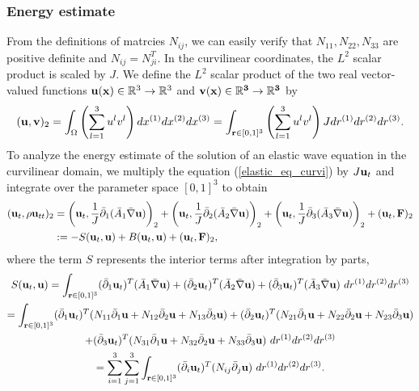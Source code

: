 \subsubsection{Energy estimate}
From the definitions of matrcies $N_{ij}$, we can easily verify that $N_{11}, N_{22}, N_{33}$ are positive definite and $N_{ij} = N_{ji}^T$. In the curvilinear coordinates, the $L^2$ scalar product is scaled by $J$. We define the $L^2$ scalar product of the two real vector-valued functions ${\bf u}({\bf x})\in\mathbb{R}^3\rightarrow \mathbb{R}^3$ and ${\bf v}(\bf x)\in\mathbb{R}^3\rightarrow \mathbb{R}^3$ by
\begin{equation*}
({\bf u},{\bf v})_2 = \int_{\Omega}  \left(\sum_{l=1}^3 u^{l}v^{l}\right)dx^{(1)}dx^{(2)}dx^{(3)} = \int_{{\bf r}\in[0,1]^3} \left(\sum_{l=1}^3 u^{l}v^{l}\right)Jdr^{(1)}dr^{(2)}dr^{(3)}.
\end{equation*}
To analyze the energy estimate of the solution of an elastic wave equation in the curvilinear domain, we multiply the equation (\ref{elastic_eq_curvi}) by $J{\bf u}_t$ and integrate over the parameter space $[0,1]^3$ to obtain
\begin{align}\label{time_deri_curvi}
({\bf u}_t,\rho {\bf u}_{tt})_2 &= \left({\bf u}_t,\frac{1}{J}\bar{\partial}_1(\bar{A}_1\bar{\nabla}{\bf u})\right)_2+ \left({\bf u}_t,\frac{1}{J}\bar{\partial}_2(\bar{A}_2\bar{\nabla}{\bf u})\right)_2+ \left({\bf u}_t,\frac{1}{J}\bar{\partial}_3(\bar{A}_3\bar{\nabla}{\bf u})\right)_2+({\bf u}_t, {\bf F})_2\nonumber\\
&:= -S({\bf u}_t,{\bf u}) + B({\bf u}_t,{\bf u}) + ({\bf u}_t,{\bf F})_2,
\end{align}
where the term $S$ represents the interior terms after integration by parts,
\begin{multline*}
S({\bf u}_t,{\bf u}) = \int_{{\bf r}\in[0,1]^3} (\bar{\partial}_1 {\bf u}_t)^T ({\bar A}_1\bar{\nabla}{\bf u}) + (\bar{\partial}_2 {\bf u}_t)^T ({\bar A}_2\bar{\nabla}{\bf u}) + (\bar{\partial}_3 {\bf u}_t)^T ({\bar A}_3\bar{\nabla}{\bf u})\ dr^{(1)}dr^{(2)}dr^{(3)}\\
= \int_{{\bf r}\in[0,1]^3} (\bar{\partial}_1 {\bf u}_t)^T (N_{11}\bar{\partial}_1{\bf u} +N_{12}\bar{\partial}_2{\bf u}+ N_{13}\bar{\partial}_3{\bf u}) + (\bar{\partial}_2 {\bf u}_t)^T (N_{21}\bar{\partial}_1{\bf u} +N_{22}\bar{\partial}_2{\bf u}+ N_{23}\bar{\partial}_3{\bf u}) \\
+(\bar{\partial}_3 {\bf u}_t)^T (N_{31}\bar{\partial}_1{\bf u} +N_{32}\bar{\partial}_2{\bf u}+ N_{33}\bar{\partial}_3{\bf u})\ dr^{(1)}dr^{(2)}dr^{(3)}\\
= \sum_{i = 1}^3\sum_{j=1}^3  \int_{{\bf r}\in[0,1]^3} (\bar{\partial}_i {\bf u}_t)^T(N_{ij}\bar{\partial}_j {\bf u})\ dr^{(1)}dr^{(2)}dr^{(3)}.
\end{multline*}
